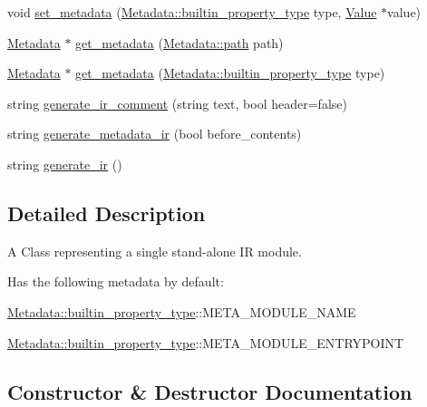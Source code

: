 \begin{DoxyCompactItemize}
void \hyperlink{classevir_1_1Module_a0522ae8c24fce527c2de575fc0550773}{set\+\_\+metadata} (\hyperlink{classevir_1_1Metadata_a292423b7a2d93f70382d1da4929f55a0}{Metadata\+::builtin\+\_\+property\+\_\+type} type, \hyperlink{classevir_1_1Value}{Value} $\ast$value)
\item 
\hyperlink{classevir_1_1Metadata}{Metadata} $\ast$ \hyperlink{classevir_1_1Module_a12fd1df72d4f47cec6a5f30b17100451}{get\+\_\+metadata} (\hyperlink{classevir_1_1Metadata_a0a3a8f0c937238fae5262283bac6286a}{Metadata\+::path} path)
\item 
\hyperlink{classevir_1_1Metadata}{Metadata} $\ast$ \hyperlink{classevir_1_1Module_a37f28d71d6f1b187505539bb81501010}{get\+\_\+metadata} (\hyperlink{classevir_1_1Metadata_a292423b7a2d93f70382d1da4929f55a0}{Metadata\+::builtin\+\_\+property\+\_\+type} type)
\item 
string \hyperlink{classevir_1_1Module_a970b46de00ba0d01c8c1ed8356a64428}{generate\+\_\+ir\+\_\+comment} (string text, bool header=false)
\item 
string \hyperlink{classevir_1_1Module_abd3b147a4e5c9e26bdb62c59461de25c}{generate\+\_\+metadata\+\_\+ir} (bool before\+\_\+contents)
\item 
string \hyperlink{classevir_1_1Module_a4f0d16ffaa997fe034b89b476825ac51}{generate\+\_\+ir} ()
\end{DoxyCompactItemize}


\subsection{Detailed Description}
A Class representing a single stand-\/alone IR module. 

Has the following metadata by default\+:
\begin{DoxyItemize}
\item \hyperlink{classevir_1_1Metadata_a292423b7a2d93f70382d1da4929f55a0}{Metadata\+::builtin\+\_\+property\+\_\+type}\+:\+:{\ttfamily M\+E\+T\+A\+\_\+\+M\+O\+D\+U\+L\+E\+\_\+\+N\+A\+ME}
\item \hyperlink{classevir_1_1Metadata_a292423b7a2d93f70382d1da4929f55a0}{Metadata\+::builtin\+\_\+property\+\_\+type}\+:\+:{\ttfamily M\+E\+T\+A\+\_\+\+M\+O\+D\+U\+L\+E\+\_\+\+E\+N\+T\+R\+Y\+P\+O\+I\+NT} 
\end{DoxyItemize}

\subsection{Constructor \& Destructor Documentation}
\mbox{\label{classevir_1_1Module_afb986e24396120d52ecd28c793948750}} 
